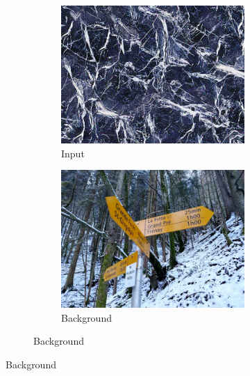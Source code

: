 \begin{figure}[]
    \centering    
    \begin{subfigure}{\textwidth}
        \centering
        \begin{subfigure}{0.24\textwidth}
            \centering
            \includegraphics[width=\textwidth]{images/04-experiment02/photo/marble/target.jpg}
            \caption*{Input}
        \end{subfigure}
        \hfill
        \begin{subfigure}{0.24\textwidth}
            \centering
            \includegraphics[width=\textwidth]{images/04-experiment02/photo/bg.jpg}
            \caption*{Background}

\end{subfigure}
\end{subfigure}
\end{figure}
